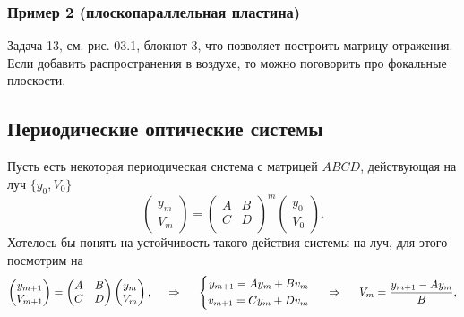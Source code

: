 \subsubsection*{Пример 2 (плоскопараллельная пластина)}

Задача 13, см. рис. 03.1, блокнот 3, что позволяет построить матрицу отражения. Если добавить распространения в воздухе, то можно поговорить про фокальные плоскости. 


\subsection{Периодические оптические системы}

Пусть есть некоторая периодическая система с матрицей $ABCD$, действующая на луч $\{y_0, V_0\}$
\begin{equation*}
    \begin{pmatrix}
        y_m \\ V_m
    \end{pmatrix} = 
    \begin{pmatrix}
        A & B \\
        C & D \\
    \end{pmatrix}^m
    \begin{pmatrix}
        y_0 \\ V_0
    \end{pmatrix}.
\end{equation*}
Хотелось бы понять на устойчивость такого действия системы на луч, для этого посмотрим на 
\begin{equation*}
    \begin{pmatrix}
        y_{m+1} \\ V_{m+1}
    \end{pmatrix} = 
    \begin{pmatrix}
        A & B \\
        C & D \\
    \end{pmatrix} \begin{pmatrix}
        y_m \\ V_m
    \end{pmatrix},
    \hspace{0.5cm} \Rightarrow \hspace{0.5cm}
    \left\{\begin{aligned}
        y_{m+1} = A y_m + B v_m \\
        v_{m+1} = C y_m + D v_m
    \end{aligned}\right.
    \hspace{0.5cm} \Rightarrow \hspace{0.5cm}
    V_m = \frac{y_{m+1}-Ay_m}{B},
\end{equation*}
